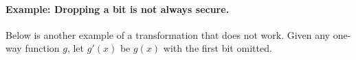 

\paragraph{Example: Dropping a bit is not always secure.}
Below is another example of a transformation that does not work. Given any one-way function $g$, let $g'(x)$ be $g(x)$ with the first bit omitted.

